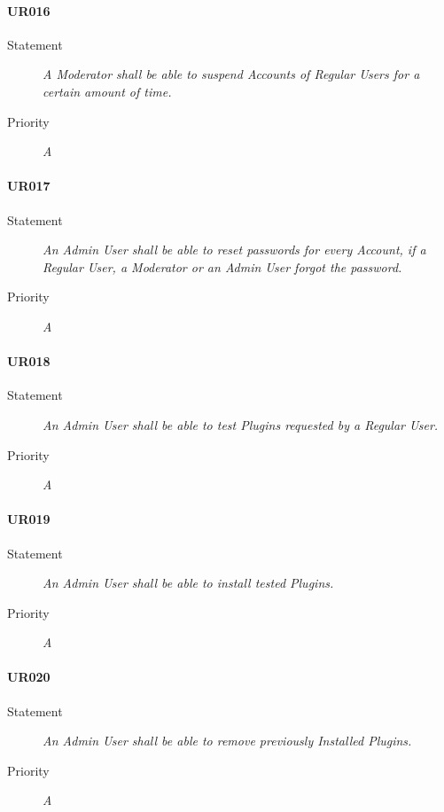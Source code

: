 \paragraph{UR016}
\begin{description}
  \item [Statement] 
    \textit{A \gls{Moderator} shall be able to suspend \gls{Account}s of \gls{Regular User}s for a certain amount of time.}
  \item [Priority] \textit{A}
\end{description}

\paragraph{UR017}
\begin{description}
  \item [Statement] 
    \textit{An \gls{Admin User} shall be able to reset passwords for every \gls{Account}, if a \gls{Regular User}, a \gls{Moderator} or an \gls{Admin User} forgot the password.}
  \item [Priority] \textit{A}
\end{description}

\paragraph{UR018}
\begin{description}
  \item [Statement] 
    \textit{An \gls{Admin User} shall be able to test \gls{Plugins} requested by a \gls{Regular User}.}
  \item [Priority] \textit{A}
\end{description}

\paragraph{UR019}
\begin{description}
  \item [Statement] 
    \textit{An \gls{Admin User} shall be able to install tested \gls{Plugins}.}
  \item [Priority] \textit{A}
\end{description}

\paragraph{UR020}
\begin{description}
  \item [Statement] 
    \textit{An \gls{Admin User} shall be able to remove previously \gls{Installed Plugins}.}
  \item [Priority] \textit{A}
\end{description}


